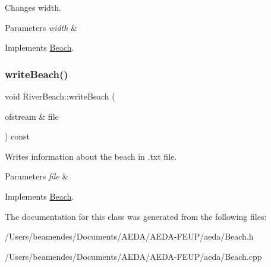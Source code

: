 Changes width. 


\begin{DoxyParams}{Parameters}
{\em width} & \\
\hline
\end{DoxyParams}


Implements \hyperlink{class_beach_a3f3a4bde9008bcc87861710e8c99c008}{Beach}.

\mbox{\label{class_river_beach_acdbf29ab6540a2b0a5fd18cbea14375b}} 
\subsubsection{\texorpdfstring{write\+Beach()}{writeBeach()}}
{\footnotesize\ttfamily void River\+Beach\+::write\+Beach (\begin{DoxyParamCaption}\item[{ofstream \&}]{file }\end{DoxyParamCaption}) const\hspace{0.3cm}{\ttfamily [virtual]}}



Writes information about the beach in .txt file. 


\begin{DoxyParams}{Parameters}
{\em file} & \\
\hline
\end{DoxyParams}


Implements \hyperlink{class_beach_a2ba3bf80382fa1b5e00befe0c4ccde88}{Beach}.



The documentation for this class was generated from the following files\+:\begin{DoxyCompactItemize}
\item 
/\+Users/beamendes/\+Documents/\+A\+E\+D\+A/\+A\+E\+D\+A-\/\+F\+E\+U\+P/aeda/Beach.\+h\item 
/\+Users/beamendes/\+Documents/\+A\+E\+D\+A/\+A\+E\+D\+A-\/\+F\+E\+U\+P/aeda/Beach.\+cpp\end{DoxyCompactItemize}
